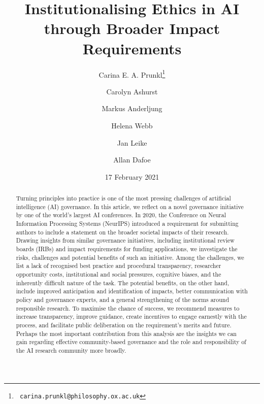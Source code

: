 \documentclass[11pt,english]{article}
\begin{document}
	\title{Institutionalising Ethics in AI through Broader Impact Requirements}
	\author[1,2]{Carina E. A. Prunkl\thanks{\texttt{
				carina.prunkl@philosophy.ox.ac.uk}}
	} 
	\author[2]{Carolyn Ashurst}
	\author[2]{Markus Anderljung}
	\author[3]{Helena Webb}
	\author[2]{Jan Leike}
	\author[2]{Allan Dafoe}
	
	\date{17 February 2021}
	\maketitle
	{\small \begin{abstract}
			Turning principles into practice is one of the most pressing challenges of artificial intelligence (AI) governance. In this article, we reflect on a novel governance initiative by one of the world's largest AI conferences. In 2020, the Conference on Neural Information Processing Systems (NeurIPS) introduced a requirement for submitting authors to include a statement on the broader societal impacts of their research. Drawing insights from similar governance initiatives, including institutional review boards (IRBs) and impact requirements for funding applications, we investigate the risks, challenges and potential benefits of such an initiative. Among the challenges, we list a lack of recognised best practice and procedural transparency, researcher opportunity costs, institutional and social pressures, cognitive biases, and the inherently difficult nature of the task. The potential benefits, on the other hand, include improved anticipation and identification of impacts, better communication with policy and governance experts, and a general strengthening of the norms around responsible research. To maximise the chance of success, we recommend measures to increase transparency, improve guidance, create incentives to engage earnestly with the process, and facilitate public deliberation on the requirement's merits and future. Perhaps the most important contribution from this analysis are the insights we can gain regarding effective community-based governance and the role and responsibility of the AI research community more broadly.
	\end{abstract}}
	
\end{document}
